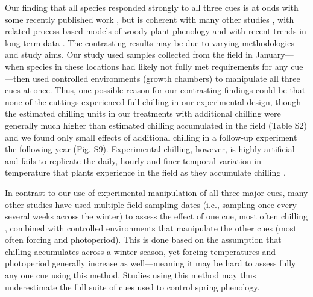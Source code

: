 \documentclass[11pt]{article}
\begin{document}
Our finding that all species responded strongly to all three cues is at odds with some recently published work \citep{Basler:2012aa,laube2014gcb,zohner2016ncc}, but is coherent with many other studies \citep[e.g.,][]{Worrall:1967aa,Heide:1993b}, with related process-based models of woody plant phenology \citep{Chuine:2000,chuine2016} and with recent trends in long-term data \citep[e.g,][]{fu2015,carter2017}. The contrasting results may be due to varying methodologies and study aims. Our study used samples collected from the field in January---when species in these locations had likely not fully met requirements for any cue---then used controlled environments (growth chambers) to manipulate all three cues at once. Thus, one possible reason for our contrasting findings could be that none of the cuttings experienced full chilling in our experimental design, though the estimated chilling units in our treatments with additional chilling were generally much higher than estimated chilling accumulated in the field (Table S2) and we found only small effects of additional chilling in a follow-up experiment the following year (Fig. S9). Experimental chilling, however, is highly artificial and fails to replicate the daily, hourly and finer temporal variation in temperature that plants experience in the field as they accumulate chilling \citep{Erez:1988,Luedeling:2009}. 

In contrast to our use of experimental manipulation of all three major cues, many other studies have used multiple field sampling dates (i.e., sampling once every several weeks across the winter) to assess the effect of one cue, most often chilling \citep{weinberger,laube2014gcb,zohner2017}, combined with controlled environments that manipulate the other cues (most often forcing and photoperiod). This is done based on the assumption that chilling accumulates across a winter season, yet forcing temperatures and photoperiod generally increase as well---meaning it may be hard to assess fully any one cue using this method. Studies using this method may thus underestimate the full suite of cues used to control spring phenology. 
\end{document}
